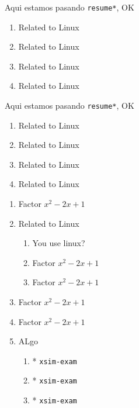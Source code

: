 \documentclass{article}
\begin{document}
Aqui estamos pasando \verb+resume*+, OK

\begin{enumerate}[resume]
  \item Related to Linux
  \item Related to Linux
  \item Related to Linux
  \item Related to Linux
\end{enumerate}
\stop



Aqui estamos pasando \verb+resume*+, OK

\begin{enumerate}[resume*]
  \item Related to Linux
  \item Related to Linux
  \item Related to Linux
  \item Related to Linux
\end{enumerate}
\stop



\begin{enumerate}[save-ans=simplews,columns=1,check-ans=true,show-pos=true,show-pos=true,show-pos=true,nosep,save-ref=true,wrap-label={\fbox{#1}}]
  \item Factor $x^{2}-2x+1$ 
  \item Related to Linux
    \begin{enumerate}[nosep,columns*=2]
      \item You use linux? 
      \item Factor $x^{2}-2x+1$ 
      \item Factor $x^{2}-2x+1$ 
    \end{enumerate}
   \item Factor $x^{2}-2x+1$ 
   \item Factor $x^{2}-2x+1$ 
   \item ALgo
         \begin{enumerate}[nosep]
          \item* \texttt{xsim-exam} 
           \item* \texttt{xsim-exam} 
            \item* \texttt{xsim-exam} 
        \end{enumerate}
\end{enumerate}
\end{document}
